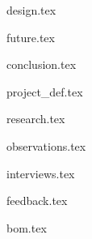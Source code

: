 \documentclass{book}
\begin{document}
{design.tex}

{future.tex}

{conclusion.tex}

\appendix

{project_def.tex}

{research.tex}

{observations.tex}

{interviews.tex}

{feedback.tex}

{bom.tex}

\backmatter
\end{document}
